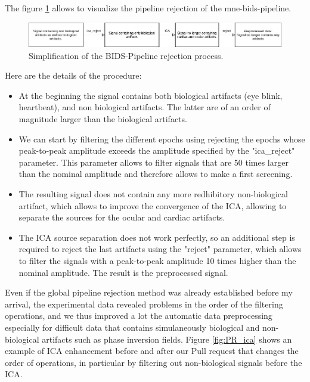 The figure \ref{rejection_pipeline} allows to visualize the pipeline rejection of the mne-bids-pipeline.

\begin{figure}[ht]
    \centering
    \includegraphics[width=15cm]{images_report/preprocessing/rejection_pipeline.png}
    \caption[Simplification of the BIDS-Pipeline rejection process.]%
    {Simplification of the BIDS-Pipeline rejection process.}
    \label{rejection_pipeline}
\end{figure}

Here are the details of the procedure:
\begin{itemize}
    \item At the beginning the signal contains both biological artifacts (eye blink, heartbeat), and non biological artifacts. The latter are of an order of magnitude larger than the biological artifacts.
    \item We can start by filtering the different epochs using rejecting the epochs whose peak-to-peak amplitude exceeds the amplitude specified by the "ica\_reject" parameter. This parameter allows to filter signals that are 50 times larger than the nominal amplitude and therefore allows to make a first screening.
    \item The resulting signal does not contain any more redhibitory non-biological artifact, which allows to improve the convergence of the ICA, allowing to separate the sources for the ocular and cardiac artifacts.
    \item The ICA source separation does not work perfectly, so an additional step is required to reject the last artifacts using the "reject" parameter, which allows to filter the signals with a peak-to-peak amplitude 10 times higher than the nominal amplitude. The result is the preprocessed signal.
\end{itemize}

Even if the global pipeline rejection method was already established before my arrival, the experimental data revealed problems in the order of the filtering operations, and we thus improved a lot the automatic data preprocessing especially for difficult data that contains simulaneously biological and non-biological artifacts such as phase inversion fields. Figure \ref{fig:PR_ica} shows an example of ICA enhancement before and after our Pull request that changes the order of operations, in particular by filtering out non-biological signals before the ICA.


